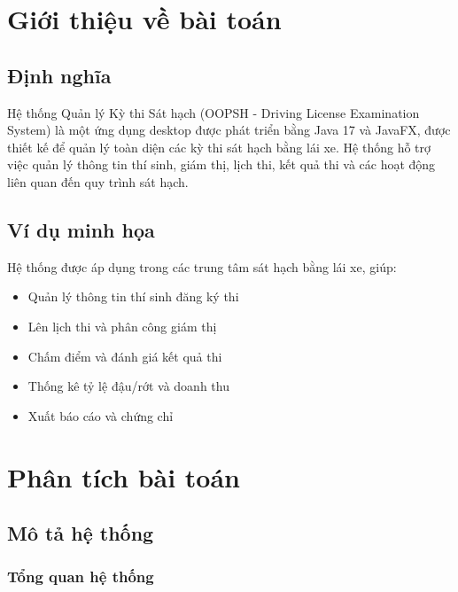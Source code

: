 \documentclass[12pt,a4paper]{article}
\begin{document}
\tableofcontents
\newpage

\listoffigures
\newpage

\listoftables
\newpage

\section{Giới thiệu về bài toán}

\subsection{Định nghĩa}

Hệ thống Quản lý Kỳ thi Sát hạch (OOPSH - Driving License Examination System) là một ứng dụng desktop được phát triển bằng Java 17 và JavaFX, được thiết kế để quản lý toàn diện các kỳ thi sát hạch bằng lái xe. Hệ thống hỗ trợ việc quản lý thông tin thí sinh, giám thị, lịch thi, kết quả thi và các hoạt động liên quan đến quy trình sát hạch.

\subsection{Ví dụ minh họa}

Hệ thống được áp dụng trong các trung tâm sát hạch bằng lái xe, giúp:
\begin{itemize}
    \item Quản lý thông tin thí sinh đăng ký thi
    \item Lên lịch thi và phân công giám thị
    \item Chấm điểm và đánh giá kết quả thi
    \item Thống kê tỷ lệ đậu/rớt và doanh thu
    \item Xuất báo cáo và chứng chỉ
\end{itemize}

\section{Phân tích bài toán}

\subsection{Mô tả hệ thống}

\subsubsection{Tổng quan hệ thống}
\end{document}
